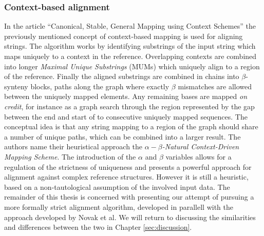 \documentclass[thesis.tex]{subfiles}
\begin{document}
\subsubsection{Context-based alignment}
\label{sec:canonical}
In the article ``Canonical, Stable, General Mapping using Context Schemes''\cite{canonical_stable_general_mapping_using_context_schemes} the previously mentioned concept of context-based mapping is used for aligning strings. The algorithm works by identifying substrings of the input string which maps uniquely to a context in the reference. Overlapping contexts are combined into longer \textit{Maximal Unique Substrings} (MUMs) which uniquely align to a region of the reference. Finally the aligned substrings are combined in chains into $\beta$-synteny blocks, paths along the graph where exactly $\beta$ mismatches are allowed between the uniquely mapped elements. Any remaining bases are mapped \textit{on credit}, for instance as a graph search through the region represented by the gap between the end and start of to consecutive uniquely mapped sequences. The conceptual idea is that any string mapping to a region of the graph should share a number of unique paths, which can be combined into a larger result. The authors name their heuristical approach the \textit{$\alpha-\beta$-Natural Context-Driven Mapping Scheme}. The introduction of the $\alpha$ and $\beta$ variables allows for a regulation of the strictness of uniqueness and presents a powerful approach for alignment against complex reference structures. However it is still a heuristic, based on a non-tautological assumption of the involved input data. The remainder of this thesis is concerned with presenting our attempt of pursuing a more formally strict alignment algorithm, developed in parallell with the approach developed by Novak et al. We will return to discussing the similarities and differences between the two in Chapter \ref{sec:discussion}.
\end{document}
